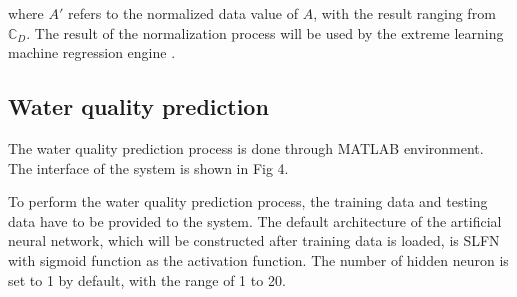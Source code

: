 \documentclass[journal,comsoc]{IEEEtran}
\let\MYoriglatexcaption\caption
\renewcommand{\caption}[2][\relax]{\MYoriglatexcaption[#2]{#2}}
\begin{document}
where $A'$ refers to the normalized data value of $A$, with the result ranging from $\mathbb{C}_{D}$. The result of the normalization process will be used by the extreme learning machine regression engine \cite{Zhu13}.

\subsection{Water quality prediction}

The water quality prediction process is done through MATLAB environment. The interface of the system is shown in Fig 4.


To perform the water quality prediction process, the training data and testing data have to be provided to the system. The default architecture of the artificial neural network, which will be constructed after training data is loaded, is SLFN with sigmoid function as the activation function. The number of hidden neuron is set to 1 by default, with the range of 1 to 20.




%
%
\end{document}
